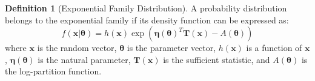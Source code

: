 \documentclass[letterpaper]{article} %
\theoremstyle{definition}
\newtheorem{definition}[theorem]{Definition}
\theoremstyle{remark}
\begin{document}
\begin{definition}[Exponential Family Distribution]
A probability distribution belongs to the exponential family if its density function can be expressed as:
\begin{equation}
f(\mathbf{x}|\boldsymbol{\theta}) = h(\mathbf{x})\exp\left(\boldsymbol{\eta}(\boldsymbol{\theta})^T \mathbf{T}(\mathbf{x}) - A(\boldsymbol{\theta})\right)
\end{equation}
where $\mathbf{x}$ is the random vector, $\boldsymbol{\theta}$ is the parameter vector, $h(\mathbf{x})$ is a function of $\mathbf{x}$, $\boldsymbol{\eta}(\boldsymbol{\theta})$ is the natural parameter, $\mathbf{T}(\mathbf{x})$ is the sufficient statistic, and $A(\boldsymbol{\theta})$ is the log-partition function.
\end{definition}
\end{document}
